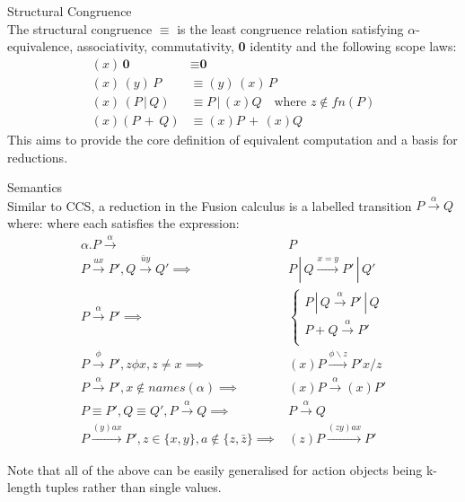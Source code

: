     \begin{definition}{Structural Congruence\\}
        \label{fusion-calculus-structural-congruence}
        The structural congruence $\equiv$ is the least congruence relation satisfying $\alpha$-equivalence, associativity, commutativity, \textbf{0} identity and the following scope laws:
        \begin{align*}
            (x) \, \textbf{0}       & \equiv \textbf{0} \\
            (x) \, (y) \, P         & \equiv (y) \, (x) \, P \\
            (x) \, (P \, | \, Q)    & \equiv P \, | \, (x)Q \quad \text{where $z \notin fn(P)$} \\
            (x)(P \, + \, Q)        & \equiv (x)P \, + \, (x)Q
        \end{align*}
        This aims to provide the core definition of equivalent computation and a basis for reductions.
    \end{definition}


    \begin{definition}{Semantics\\}
        Similar to CCS, a reduction in the Fusion calculus is a labelled transition $P \xrightarrow{\alpha} Q$ where:
        where each satisfies the expression:
        \begin{align*}
            \alpha . P \xrightarrow{\alpha}                             & P \\
            P \xrightarrow{ux} P', Q \xrightarrow{\bar{u}y} Q' \implies & P \, | \, Q \xrightarrow{x = y} P' \, | \, Q' \\
            P \xrightarrow{\alpha} P' \implies                          &
            \begin{cases}
                P \, | \, Q \xrightarrow{\alpha} P' \, | \, Q \\
                P + Q \xrightarrow{\alpha} P' \\
            \end{cases} \\
            P \xrightarrow{\phi} P', z \phi x, z \neq x \implies                            & (x)P \xrightarrow{\phi \backslash z} P'{x / z} \\
            P \xrightarrow{\alpha} P', x \notin names(\alpha) \implies                      & (x)P \xrightarrow{\alpha} (x)P' \\
            P \equiv P', Q \equiv Q', P \xrightarrow{\alpha} Q \implies                     & P \xrightarrow{\alpha} Q \\
            P \xrightarrow{(y) a x} P', z \in \{x, y\}, a \notin \{z, \bar{z}\} \implies    & (z)P \xrightarrow{(z y) a x} P'
        \end{align*}
    \end{definition}
    Note that all of the above can be easily generalised for action objects being k-length tuples rather than single values.


